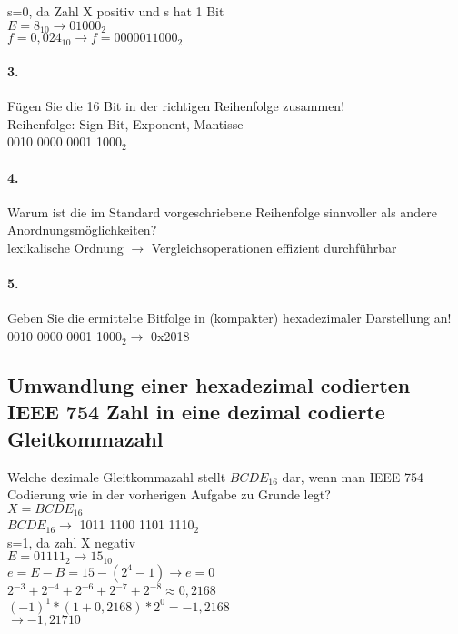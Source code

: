 \documentclass[paper=a4, fontsize=11pt]{scrartcl}
\numberwithin{equation}{section}
\numberwithin{figure}{section}
\numberwithin{table}{section}
\begin{document}
s=0, da Zahl X positiv und s hat 1 Bit \\

$E = 8_{10} \rightarrow 01000_{2}$ \\

$f = 0,024_{10} \rightarrow f=0000 0110 00_{2}$

\paragraph{3.}
Fügen Sie die 16 Bit in der richtigen Reihenfolge zusammen! \\

Reihenfolge: Sign Bit, Exponent, Mantisse \\
0010 0000 0001 100$0_{2}$

\paragraph{4.}
Warum ist die im Standard vorgeschriebene Reihenfolge sinnvoller als andere Anordnungsmöglichkeiten? \\

lexikalische Ordnung $\rightarrow$ Vergleichsoperationen effizient durchführbar

\paragraph{5.}
Geben Sie die ermittelte Bitfolge in (kompakter) hexadezimaler Darstellung an! \\
0010 0000 0001 100$0_{2} \rightarrow$ 0x2018


\subsection{Umwandlung einer hexadezimal codierten IEEE 754 Zahl in eine dezimal codierte Gleitkommazahl}

Welche dezimale Gleitkommazahl stellt $BCDE_{16}$ dar, wenn man IEEE 754 Codierung wie in der vorherigen Aufgabe zu Grunde legt? \\

$X=BCDE_{16}$ \\
$BCDE_{16} \rightarrow$ 1011 1100 1101 111$0_{2}$ \\
s=1, da zahl X negativ\\
$E= 01111_{2} \rightarrow 15_{10}$ \\
$e=E-B=15-(2^{4}-1) \rightarrow e=0$ \\
$2^{-3}+2^{-4}+2^{-6}+2^{-7}+2^{-8} \approx 0,2168$ \\
$(-1)^{1}*(1+ 0,2168)*2^{0} = -1,2168$ \\
$ \rightarrow -1,217{10}$
\end{document}
